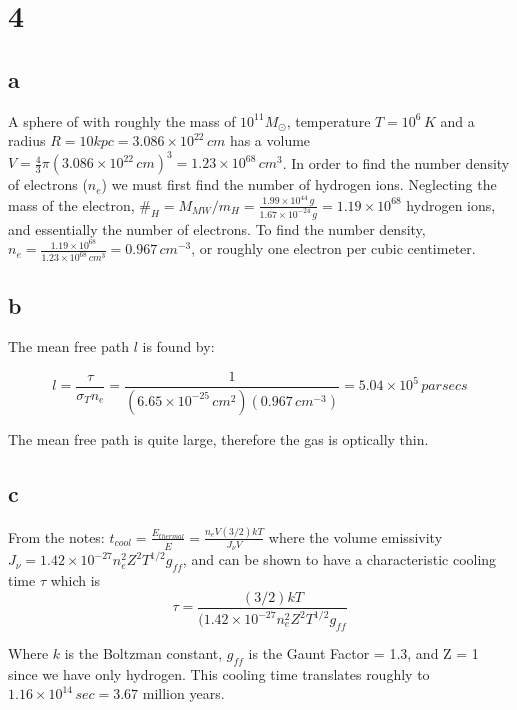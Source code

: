 \documentclass{article}
\begin{document}
\section*{4}
\subsection*{a}

A sphere of with roughly the mass of $10^{11} M_{\odot}$, temperature $T=10^6 \, K$ and a radius $R = 10 kpc = 3.086 \times 10^{22} \, cm$ has a volume $V = \frac{4}{3} \pi (3.086 \times 10^{22} \, cm)^3 = 1.23 \times 10^{68} \, cm^3 $. In order to find the number density of electrons ($n_e$) we must first find the number of hydrogen ions. Neglecting the mass of the electron, $ \#_H = M_{MW} / m_H = \frac{1.99 \times 10^{44} \, g}{1.67 \times 10^{-24} \, g} = 1.19 \times 10^{68}$ hydrogen ions, and essentially the number of electrons. To find the number density, $n_e = \frac{1.19 \times 10^{68}}{1.23 \times 10^{68} \, cm^3} = 0.967 \, cm^{-3}$, or roughly one electron per cubic centimeter.

\subsection*{b}

The mean free path $l$ is found by:

\begin{equation}
l = \frac{\tau}{\sigma_T n_e } = \frac{1}{(6.65 \times 10^{-25} \,cm^2)(0.967 \, cm^{-3})} = 5.04 \times 10^5 \, parsecs
\end{equation}

The mean free path is quite large, therefore the gas is optically thin.

\subsection*{c}

From the notes: $t_{cool} = \frac{E_{thermal}}{\dot{E}}= \frac{n_e V (3/2)kT}{J_{\nu}V}$ where the volume emissivity $J_{\nu} = 1.42 \times 10^{-27} n_e^2 Z^2 T^{1/2} g_{ff}$, and can be shown to have a characteristic cooling time $\tau$ which is
\begin{equation}
\tau =  \frac{(3/2)kT}{(1.42 \times 10^{-27} n_e^2 Z^2 T^{1/2} g_{ff}}
\end{equation}

Where $k$ is the Boltzman constant, $g_{ff}$ is the Gaunt Factor = 1.3, and Z = 1 since we have only hydrogen. This cooling time translates roughly to $1.16\times 10^{14} \, sec= 3.67$ million years.
\end{document}
